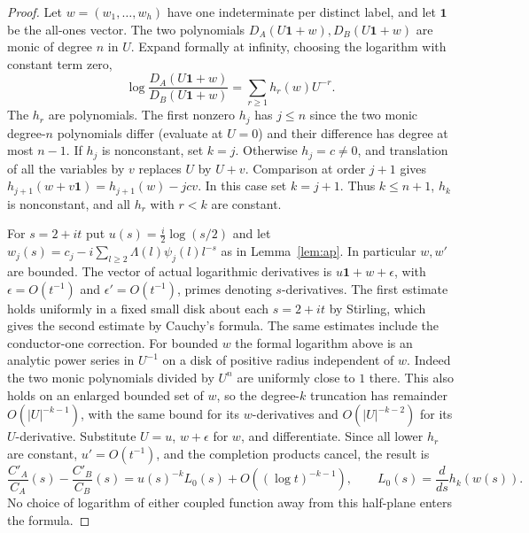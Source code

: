 \begin{proof}
Let $w=(w_1,\ldots,w_h)$ have one indeterminate per distinct label, and let $\mathbf1$ be the all-ones vector. The two polynomials $D_A(U\mathbf1+w),D_B(U\mathbf1+w)$ are monic of degree $n$ in $U$. Expand formally at infinity, choosing the logarithm with constant term zero,
\[
 \log\frac{D_A(U\mathbf1+w)}{D_B(U\mathbf1+w)}
 =\sum_{r\ge1} h_r(w)U^{-r} .
\]
The $h_r$ are polynomials. The first nonzero $h_j$ has $j\le n$ since the two monic degree-$n$ polynomials differ (evaluate at $U=0$) and their difference has degree at most $n-1$. If $h_j$ is nonconstant, set $k=j$. Otherwise $h_j=c\ne0$, and translation of all the variables by $v$ replaces $U$ by $U+v$. Comparison at order $j+1$ gives $h_{j+1}(w+v\mathbf1)=h_{j+1}(w)-jc v$. In this case set $k=j+1$. Thus $k\le n+1$, $h_k$ is nonconstant, and all $h_r$ with $r<k$ are constant.

For $s=2+it$ put $u(s)=\tfrac i2\log(s/2)$ and let $w_j(s)=c_j-i\sum_{l\ge2}\Lambda(l)\psi_j(l)l^{-s}$ as in Lemma~\ref{lem:ap}. In particular $w,w'$ are bounded. The vector of actual logarithmic derivatives is $u\mathbf1+w+\epsilon$, with $\epsilon=O(t^{-1})$ and $\epsilon'=O(t^{-1})$, primes denoting $s$-derivatives. The first estimate holds uniformly in a fixed small disk about each $s=2+it$ by Stirling, which gives the second estimate by Cauchy's formula. The same estimates include the conductor-one correction. For bounded $w$ the formal logarithm above is an analytic power series in $U^{-1}$ on a disk of positive radius independent of $w$. Indeed the two monic polynomials divided by $U^n$ are uniformly close to $1$ there. This also holds on an enlarged bounded set of $w$, so the degree-$k$ truncation has remainder $O(|U|^{-k-1})$, with the same bound for its $w$-derivatives and $O(|U|^{-k-2})$ for its $U$-derivative. Substitute $U=u$, $w+\epsilon$ for $w$, and differentiate. Since all lower $h_r$ are constant, $u'=O(t^{-1})$, and the completion products cancel, the result is
\[
 \frac{C'_A}{C_A}(s)-\frac{C'_B}{C_B}(s)
 = u(s)^{-k}L_0(s)+O((\log t)^{-k-1}),\qquad
 L_0(s)=\frac{d}{ds}h_k(w(s)).
\]
No choice of logarithm of either coupled function away from this half-plane enters the formula.


\end{proof}
